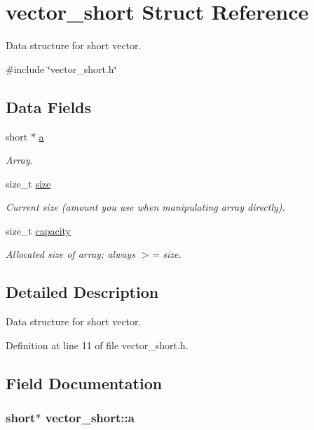 \hypertarget{structvector__short}{\section{vector\-\_\-short Struct Reference}
\label{structvector__short}
}


Data structure for short vector.  




{\ttfamily \#include \char`\"{}vector\-\_\-short.\-h\char`\"{}}

\subsection*{Data Fields}
\begin{DoxyCompactItemize}
\item 
short $\ast$ \hyperlink{structvector__short_a00c0c3c687265f312f823516ba10f5ba}{a}
\begin{DoxyCompactList}\small\item\em Array. \end{DoxyCompactList}\item 
size\-\_\-t \hyperlink{structvector__short_a40844e43099756849900956e128123a3}{size}
\begin{DoxyCompactList}\small\item\em Current size (amount you use when manipulating array directly). \end{DoxyCompactList}\item 
size\-\_\-t \hyperlink{structvector__short_a06409947c0c59b65b52537c6bade6569}{capacity}
\begin{DoxyCompactList}\small\item\em Allocated size of array; always $>$= size. \end{DoxyCompactList}\end{DoxyCompactItemize}


\subsection{Detailed Description}
Data structure for short vector. 



Definition at line 11 of file vector\-\_\-short.\-h.



\subsection{Field Documentation}
\hypertarget{structvector__short_a00c0c3c687265f312f823516ba10f5ba}{
\subsubsection[{a}]{\setlength{\rightskip}{0pt plus 5cm}short$\ast$ vector\-\_\-short\-::a}}\label{structvector__short_a00c0c3c687265f312f823516ba10f5ba}


